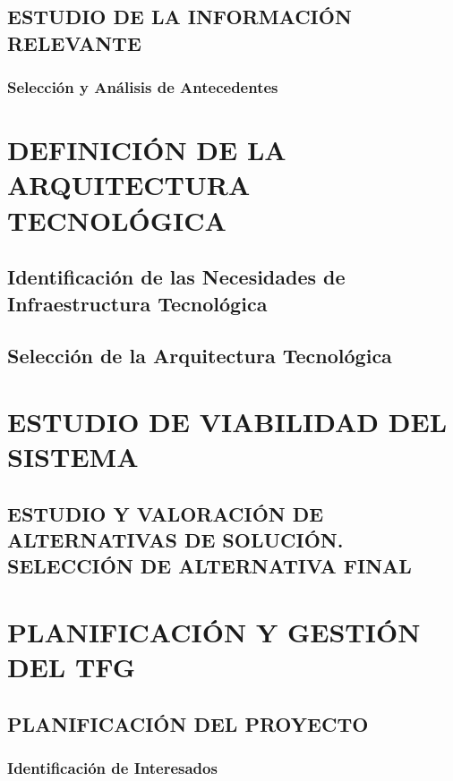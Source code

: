 \documentclass[11pt]{report}
\begin{document}
\newpage
\section{ESTUDIO DE LA INFORMACIÓN RELEVANTE}
 
\subsection{Selección y Análisis de Antecedentes} 


\chapter{DEFINICIÓN DE LA ARQUITECTURA TECNOLÓGICA}

\newpage

\section{Identificación de las Necesidades de Infraestructura Tecnológica} 

\newpage
\section{Selección de la Arquitectura Tecnológica} 

\newpage
\chapter{ESTUDIO DE VIABILIDAD DEL SISTEMA}
	
\newpage


\section{ESTUDIO Y VALORACIÓN DE ALTERNATIVAS DE SOLUCIÓN. SELECCIÓN DE ALTERNATIVA FINAL}




\newpage
\chapter{PLANIFICACIÓN Y GESTIÓN DEL TFG}
\newpage

\newpage
\section{PLANIFICACIÓN DEL PROYECTO}

\subsection{Identificación de Interesados}
\end{document}
